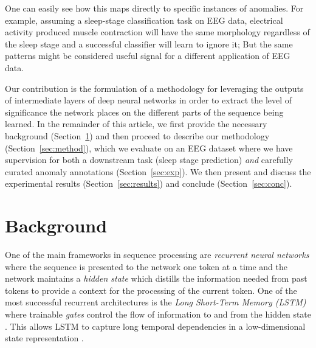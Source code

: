 \documentclass[runningheads]{llncs}
\begin{document}
One can easily see how this maps directly to specific instances of
anomalies. For example, assuming a sleep-stage classification task on
EEG data, electrical activity produced muscle contraction will
have the same morphology regardless of the sleep stage and a
successful classifier will learn to ignore it; But the same patterns
might be considered useful signal for a different application of EEG
data.

Our contribution is the formulation of a methodology for leveraging
the outputs of intermediate layers of deep neural networks in order
to extract the level of significance the network places on the
different parts of the sequence being learned. In the remainder of
this article, we first provide the necessary background
(Section~\ref{sec:bg}) and then proceed to describe our
methodology (Section~\ref{sec:method}), which we evaluate on
an EEG dataset where we have supervision for both a downstream task
(sleep stage prediction) \emph{and} carefully curated anomaly
annotations (Section~\ref{sec:exp}). We then present and discuss
the experimental results (Section~\ref{sec:results}) and conclude
(Section~\ref{sec:conc}).



\section{Background}
\label{sec:bg}


One of the main frameworks in sequence processing are
\emph{recurrent neural networks} where the sequence is presented to
the network one token at a time and the network maintains a
\emph{hidden state} which distills the information needed from past
tokens to provide a context for the processing of the current token.
One of the most successful recurrent architectures is the
\emph{Long Short-Term Memory (LSTM)} where trainable \emph{gates}
control the flow of information to and from the hidden state
\cite{hochreiter-schmidhuber:1997}. This allows LSTM to capture long
temporal dependencies in a low-dimensional state representation
\cite{HOJJATI2024106106,10744017}.
\end{document}
